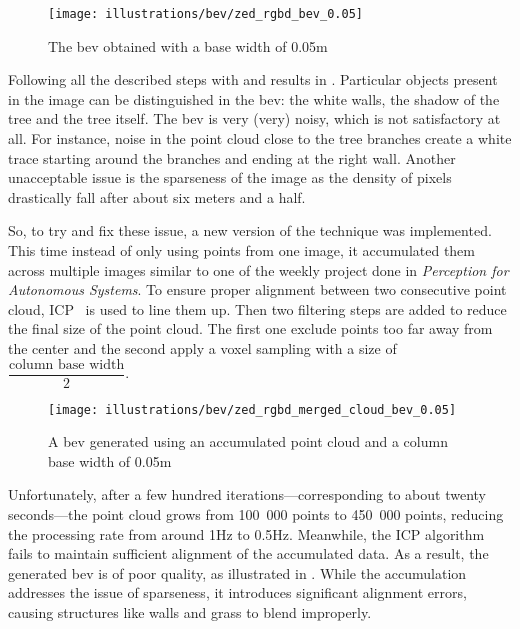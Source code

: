\begin{figure}[ht!]
    \centering
    \texttt{[image: illustrations/bev/zed\_rgbd\_bev\_0.05]}
    \caption{The \gls{bev} obtained with a base width of 0.05m}
    \label{fig:pcd_rgbd:bev_0.05}
\end{figure}

Following all the described steps with  and  results in .
Particular objects present in the image can be distinguished in the \gls{bev}: the white walls, the shadow of the tree and the tree itself.
The \gls{bev} is very (very) noisy, which is not satisfactory at all.
For instance, noise in the point cloud close to the tree branches create a white trace starting around the branches and ending at the right wall.
Another unacceptable issue is the sparseness of the image as the density of pixels drastically fall after about six meters and a half.

So, to try and fix these issue, a new version of the technique was implemented.
This time instead of only using points from one image, it accumulated them across multiple images similar to one of the weekly project
done in \textit{Perception for Autonomous Systems}. %
To ensure proper alignment between two consecutive point cloud, ICP~\cite{besl_method_1992} is used to line them up.
Then two filtering steps are added to reduce the final size of the point cloud.
The first one exclude points too far away from the center and the second apply a voxel sampling with a size of $\dfrac{\text{column base width}}{2}$.

\begin{figure}[ht!]
    \centering
    \texttt{[image: illustrations/bev/zed\_rgbd\_merged\_cloud\_bev\_0.05]}
    \caption{A \gls{bev} generated using an accumulated point cloud and a column base width of 0.05m}
    \label{fig:pcd_rgbd:accumulated_bev_0.05}
\end{figure}

Unfortunately, after a few hundred iterations---corresponding to about twenty seconds---the point cloud grows from 100\ 000
points to 450\ 000 points, reducing the processing rate from around 1Hz to 0.5Hz.
Meanwhile, the ICP algorithm fails to maintain sufficient alignment of the accumulated data.
As a result, the generated \gls{bev} is of poor quality, as illustrated in .
While the accumulation addresses the issue of sparseness, it introduces significant alignment errors, causing structures
like walls and grass to blend improperly.

